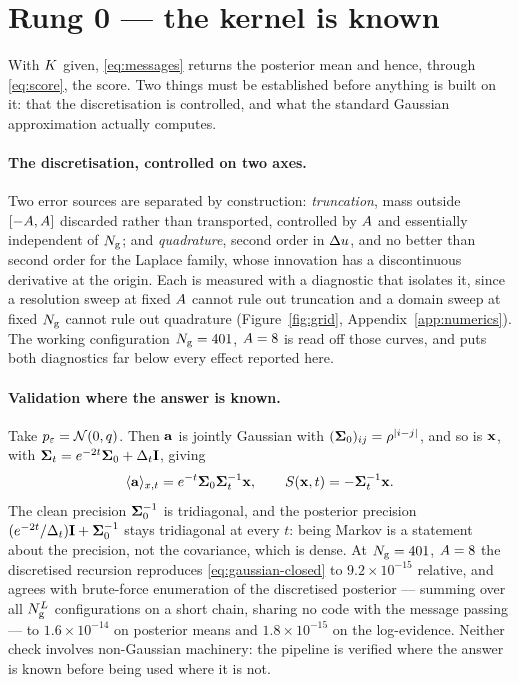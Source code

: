 \documentclass{article}
\theoremstyle{definition}
\theoremstyle{plain}
\begin{document}
\section{Rung 0 --- the kernel is known}
\label{sec:rung0}

With $K$ given, \eqref{eq:messages} returns the posterior mean and hence, through
\eqref{eq:score}, the score. Two things must be established before anything is built on it: that
the discretisation is controlled, and what the standard Gaussian approximation actually computes.

\paragraph{The discretisation, controlled on two axes.} Two error sources are separated by
construction: \emph{truncation}, mass outside $[-A,A]$ discarded rather than
transported, controlled by $A$ and essentially independent of $N_{\mathrm{g}}$; and
\emph{quadrature}, second order in $\Delta u$, and no better than second order for the Laplace
family, whose innovation has a discontinuous derivative at the origin. Each is measured with a
diagnostic that isolates it, since a resolution sweep at fixed $A$ cannot rule out
truncation and a domain sweep at fixed $N_{\mathrm{g}}$ cannot rule out quadrature
(Figure~\ref{fig:grid}, Appendix~\ref{app:numerics}). The working configuration $N_{\mathrm{g}}=401$,
$A=8$ is read off those curves, and puts both diagnostics far below every effect
reported here.

\paragraph{Validation where the answer is known.} Take $p_{\varepsilon}=\mathcal{N}\!\left(0,q\right)$. Then $\mathbf{a}$ is
jointly Gaussian with $(\mathbf{\Sigma}_0)_{ij}=\rho^{|i-j|}$, and so is $\mathbf{x}$, with
$\mathbf{\Sigma}_t = e^{-2t}\mathbf{\Sigma}_0 + \Delta_t \mathbf{I}$, giving
\begin{equation}
\label{eq:gaussian-closed}
\langle \mathbf{a} \rangle_{x,t} = e^{-t}\mathbf{\Sigma}_0\mathbf{\Sigma}_t^{-1}\mathbf{x},
\qquad
S(\mathbf{x},t) = -\mathbf{\Sigma}_t^{-1}\mathbf{x} .
\end{equation}
The clean precision $\mathbf{\Sigma}_0^{-1}$ is tridiagonal, and the posterior precision
$(e^{-2t}/\Delta_t)\mathbf{I} + \mathbf{\Sigma}_0^{-1}$ stays tridiagonal at every $t$: being Markov is a statement about
the precision, not the covariance, which is dense. At $N_{\mathrm{g}}=401$, $A=8$ the discretised
recursion reproduces \eqref{eq:gaussian-closed} to $9.2\times10^{-15}$ relative, and agrees with
brute-force enumeration of the discretised posterior --- summing over all $N_{\mathrm{g}}^{L}$
configurations on a short chain, sharing no code with the message passing --- to
$1.6\times10^{-14}$ on posterior means and $1.8\times10^{-15}$ on the log-evidence. Neither check
involves non-Gaussian machinery: the pipeline is verified where the answer is known before being
used where it is not.
\end{document}
